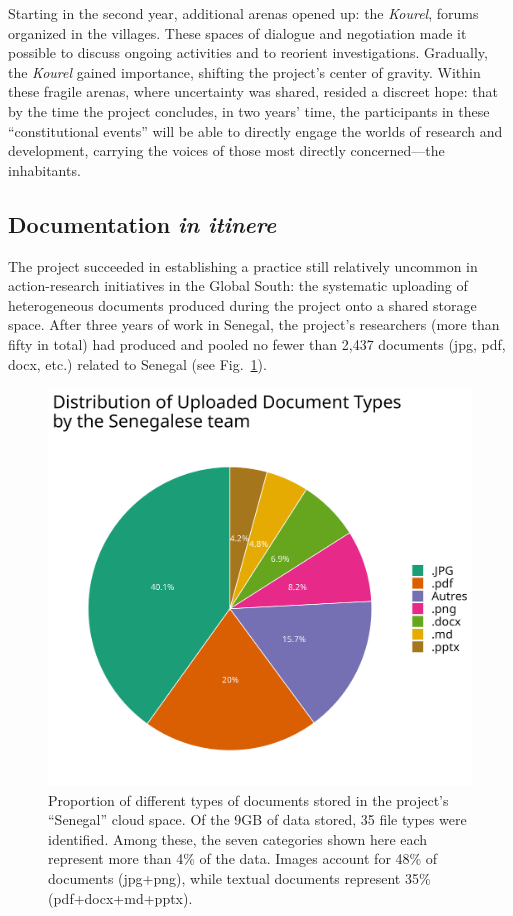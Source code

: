 \documentclass{article}
\begin{document}
Starting in the second year, additional arenas opened up: the \textit{Kourel}, forums organized in the villages. These spaces of dialogue and negotiation made it possible to discuss ongoing activities and to reorient investigations. Gradually, the \textit{Kourel} gained importance, shifting the project’s center of gravity. Within these fragile arenas, where uncertainty was shared, resided a discreet hope: that by the time the project concludes, in two years’ time, the participants in these “constitutional events” will be able to directly engage the worlds of research and development, carrying the voices of those most directly concerned—the inhabitants.  

\subsection{Documentation \textit{in itinere}}

The project succeeded in establishing a practice still relatively uncommon in action-research initiatives in the Global South: the systematic uploading of heterogeneous documents produced during the project onto a shared storage space. After three years of work in Senegal, the project’s researchers (more than fifty in total) had produced and pooled no fewer than 2,437 documents (jpg, pdf, docx, etc.) related to Senegal (see Fig.~\ref{fig:filetype}).  

\begin{figure}
    \centering
    \includegraphics[width=0.6\linewidth]{img/doc_proportion.png}
    \caption{Proportion of different types of documents stored in the project’s “Senegal” cloud space. Of the 9GB of data stored, 35 file types were identified. Among these, the seven categories shown here each represent more than 4\% of the data. Images account for 48\% of documents (jpg+png), while textual documents represent 35\% (pdf+docx+md+pptx).}
    \label{fig:filetype}
\end{figure}
\end{document}
